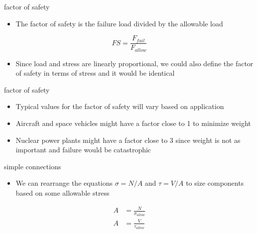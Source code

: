 \documentclass[
  letterpaper,
  ignorenonframetext,
  aspectratio=43,
  handout,
  12pt]{beamer}
\providecommand{\tightlist}{%
  \setlength{\itemsep}{0pt}\setlength{\parskip}{0pt}}
\providecommand{\tightlist}{%
\setlength{\itemsep}{0pt}\setlength{\parskip}{0pt}}
\begin{document}
\begin{frame}{factor of safety}
\protect\hypertarget{factor-of-safety}{}
\begin{itemize}
\tightlist
\item
  The factor of safety is the failure load divided by the allowable load
\end{itemize}

\[FS = \frac{F_{fail}}{F_{allow}}\]

\begin{itemize}
\tightlist
\item
  Since load and stress are linearly proportional, we could also define
  the factor of safety in terms of stress and it would be identical
\end{itemize}
\end{frame}

\begin{frame}{factor of safety}
\protect\hypertarget{factor-of-safety-1}{}
\begin{itemize}
\item
  Typical values for the factor of safety will vary based on application
\item
  Aircraft and space vehicles might have a factor close to 1 to minimize
  weight
\item
  Nuclear power plants might have a factor close to 3 since weight is
  not as important and failure would be catastrophic
\end{itemize}
\end{frame}

\begin{frame}{simple connections}
\protect\hypertarget{simple-connections}{}
\begin{itemize}
\tightlist
\item
  We can rearrange the equations \(\sigma=N/A\) and \(\tau=V/A\) to size
  components based on some allowable stress
\end{itemize}

\[\begin{aligned}
  A &= \frac{N}{\sigma_{allow}}\\
  A &= \frac{V}{\tau_{allow}}
\end{aligned}\]
\end{frame}
\end{document}
